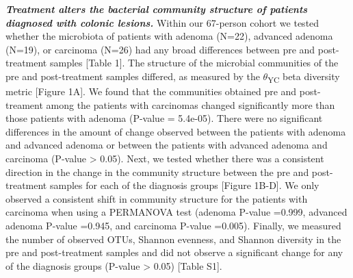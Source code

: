\documentclass[12pt,]{article}
\begin{document}
\textbf{\emph{Treatment alters the bacterial community structure of
patients diagnosed with colonic lesions.}} Within our 67-person cohort
we tested whether the microbiota of patients with adenoma (N=22),
advanced adenoma (N=19), or carcinoma (N=26) had any broad differences
between pre and post-treatment samples {[}Table 1{]}. The structure of
the microbial communities of the pre and post-treatment samples
differed, as measured by the \(\theta\)\textsubscript{YC} beta diversity
metric {[}Figure 1A{]}. We found that the communities obtained pre and
post-treament among the patients with carcinomas changed significantly
more than those patients with adenoma (P-value = 5.4e-05). There were no
significant differences in the amount of change observed between the
patients with adenoma and advanced adenoma or between the patients with
advanced adenoma and carcinoma (P-value \textgreater{} 0.05). Next, we
tested whether there was a consistent direction in the change in the
community structure between the pre and post-treatment samples for each
of the diagnosis groups {[}Figure 1B-D{]}. We only observed a consistent
shift in community structure for the patients with carcinoma when using
a PERMANOVA test (adenoma P-value =0.999, advanced adenoma P-value
=0.945, and carcinoma P-value =0.005). Finally, we measured the number
of observed OTUs, Shannon evenness, and Shannon diversity in the pre and
post-treatment samples and did not observe a significant change for any
of the diagnosis groups (P-value \textgreater{} 0.05) {[}Table S1{]}.
\end{document}
